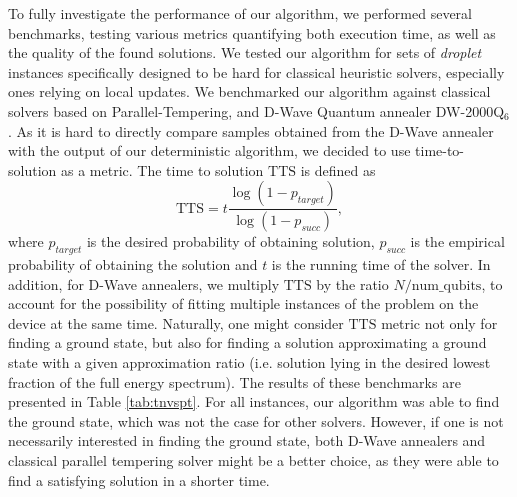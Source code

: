 To fully investigate the performance of our algorithm, we performed several
benchmarks, testing various metrics quantifying both execution time, as well as
the quality of the found solutions. We tested our algorithm for sets of
\emph{droplet} instances specifically designed to be hard for classical
heuristic solvers, especially ones relying on local updates. We benchmarked our
algorithm against classical solvers based on Parallel-Tempering, and D-Wave
Quantum annealer DW-2000Q$_6$. As it is hard to directly compare samples
obtained from the D-Wave annealer with the output of our deterministic
algorithm, we decided to use time-to-solution as a metric. The time to solution
$\mbox{TTS}$ is defined as
\begin{equation}
  \label{eq:tts}
  \mbox{TTS} = t \frac{\log(1 - p_{target})}{\log(1 - p_{succ})},
\end{equation}
where $p_{target}$ is the desired probability of obtaining solution, $p_{succ}$
is the empirical probability of obtaining the solution and $t$ is the running
time of the solver. In addition, for D-Wave annealers, we multiply $\mbox{TTS}$
by the ratio $N/\mbox{num\_qubits}$, to account for the possibility of fitting
multiple instances of the problem on the device at the same time. Naturally,
one might consider $\mbox{TTS}$ metric not only for finding a ground state, but
also for finding a solution approximating a ground state with a given
approximation ratio  (i.e. solution lying in the desired lowest
fraction of the full energy spectrum). The results of these benchmarks are
presented in Table \ref{tab:tnvspt}. For all instances, our algorithm was able
to find the ground state, which was not the case for other solvers. However, if
one is not necessarily interested in finding the ground state, both D-Wave
annealers and classical parallel tempering solver might be a better choice, as
they were able to find a satisfying solution in a shorter time.
